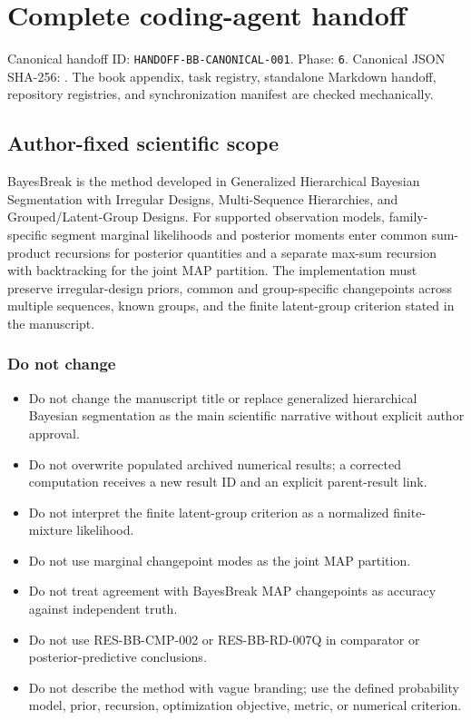 \chapter{Complete coding-agent handoff}
\label{app:coding-handoff}

\begin{statusbox}
Canonical handoff ID: \texttt{HANDOFF-BB-CANONICAL-001}. Phase: \texttt{6}. Canonical JSON SHA-256:
. The book appendix, task registry, standalone Markdown handoff, repository registries, and synchronization manifest are checked mechanically.
\end{statusbox}

\section{Author-fixed scientific scope}
BayesBreak is the method developed in Generalized Hierarchical Bayesian Segmentation with Irregular Designs, Multi-Sequence Hierarchies, and Grouped/Latent-Group Designs. For supported observation models, family-specific segment marginal likelihoods and posterior moments enter common sum-product recursions for posterior quantities and a separate max-sum recursion with backtracking for the joint MAP partition. The implementation must preserve irregular-design priors, common and group-specific changepoints across multiple sequences, known groups, and the finite latent-group criterion stated in the manuscript.

\subsection{Do not change}
\begin{itemize}[leftmargin=1.7em,itemsep=1.5pt,topsep=2pt]
\item Do not change the manuscript title or replace generalized hierarchical Bayesian segmentation as the main scientific narrative without explicit author approval.
\item Do not overwrite populated archived numerical results; a corrected computation receives a new result ID and an explicit parent-result link.
\item Do not interpret the finite latent-group criterion as a normalized finite-mixture likelihood.
\item Do not use marginal changepoint modes as the joint MAP partition.
\item Do not treat agreement with BayesBreak MAP changepoints as accuracy against independent truth.
\item Do not use RES-BB-CMP-002 or RES-BB-RD-007Q in comparator or posterior-predictive conclusions.
\item Do not describe the method with vague branding; use the defined probability model, prior, recursion, optimization objective, metric, or numerical criterion.
\end{itemize}

